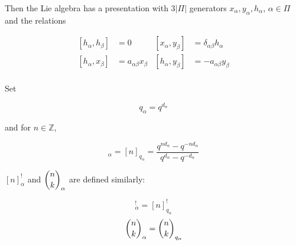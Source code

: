     Then the Lie algebra has a presentation with $3|\Pi|$ generators
    $x_\alpha, y_\alpha, h_\alpha$, $\alpha \in \Pi$ and the relations 

    \begin{align}
        \left[ h_\alpha, h_\beta \right] &= 0       &   \left[ x_\alpha, y_\beta \right] &= \delta_{\alpha\beta} h_\alpha \\
        \left[ h_\alpha, x_\beta \right] &= a_{\alpha\beta} x_\beta  &   \left[ h_\alpha, y_\beta \right] &= -a_{\alpha\beta} y_\beta \\
    \end{align}

    Set

    \begin{equation}
        q_\alpha = q^{d_\alpha}
    \end{equation}

    and for $n \in \mathbb{Z}$,

    \begin{equation}
        [n]_\alpha = [n]_{q_\alpha} = \frac{q^{nd_\alpha} - q^{-nd_\alpha}}{q^{d_\alpha} - q^{-d_\alpha}}
    \end{equation}

    $[n]_\alpha^!$ and $\dbinom{n}{k}_\alpha$ are defined similarly: 
    
    \begin{equation}
        [n]_\alpha^! = [n]_{q_{\alpha}}^!
    \end{equation}
    \begin{equation}
        \dbinom{n}{k}_\alpha = \dbinom{n}{k}_{q_\alpha}
    \end{equation}

